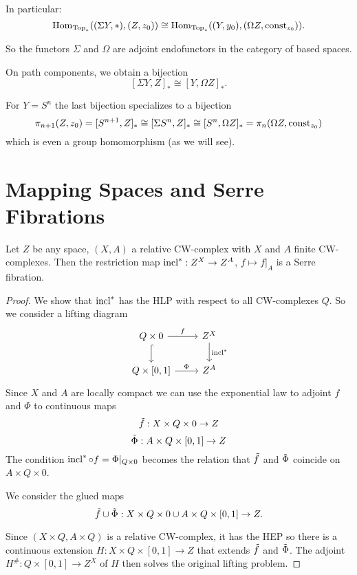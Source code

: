 In particular:
\[\operatorname{Hom}_{{\mathrm{Top}}_*}((\Sigma Y,*),(Z,z_0))\cong\operatorname{Hom}_{{\mathrm{Top}}_*}((Y,y_0),(\Omega Z,\operatorname{const}_{z_0})).\]

So the functors $\Sigma$ and $\Omega$ are adjoint endofunctors in the category of based spaces.

On path components, we obtain a bijection
\[[\Sigma Y,Z]_*\cong[Y,\Omega Z]_*.\]

For $Y=S^n$ the last bijection specializes to a bijection
\[\pi_{n+1}(Z,z_0)=[S^{n+1},Z]_*\cong[\Sigma S^n,Z]_*\cong[S^n,\Omega Z]_*=\pi_n(\Omega Z,\operatorname{const}_{z_0})\]
which is even a group homomorphism (as we will see).

\section{Mapping Spaces and Serre Fibrations}

\begin{theorem}
Let $Z$ be any space, $(X,A)$ a relative CW-complex with $X$ and $A$ finite CW-complexes. Then the restriction map $\operatorname{incl}^*:Z^X\to Z^A$, $f\mapsto f|_A$ is a Serre fibration.
\end{theorem}

\begin{proof}
We show that $\operatorname{incl}^*$ has the HLP with respect to all CW-complexes $Q$. So we consider a lifting diagram
\[\begin{tikzcd}
Q\times0 \arrow[d,hook] \arrow[r,"f"] & Z^X \arrow[d,"\incl^*"] \\
Q\times[0,1] \arrow[r,"\Phi"] & Z^A
\end{tikzcd}\]
Since $X$ and $A$ are locally compact we can use the exponential law to adjoint $f$ and $\Phi$ to continuous maps
\[\tilde f:X\times Q\times0\to Z\]
\[\tilde\Phi:A\times Q\times[0,1]\to Z\]
The condition $\operatorname{incl}^*\circ f=\Phi|_{Q\times0}$ becomes the relation that $\tilde f$ and $\tilde\Phi$ coincide on $A\times Q\times0$.

We consider the glued maps
\[\tilde f\cup\tilde\Phi:X\times Q\times 0\cup A\times Q\times[0,1]\to Z.\]

Since $(X\times Q,A\times Q)$ is a relative CW-complex, it has the HEP so there is a continuous extension $H:X\times Q\times[0,1]\to Z$ that extends $\tilde f$ and $\tilde\Phi$. The adjoint $H^\#:Q\times[0,1]\to Z^X$ of $H$ then solves the original lifting problem.
\end{proof}


